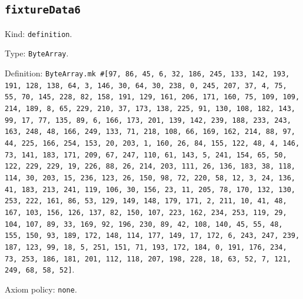 \documentclass[11pt]{article}
\begin{document}
\subsection*{\texttt{fixtureData6}}
\noindent Kind: \texttt{definition}.\par
\noindent Type: \texttt{ByteArray}.\par
\noindent Definition: \texttt{ByteArray.mk \#[97, 86, 45, 6, 32, 186, 245, 133, 142, 193, 191, 128, 138, 64, 3, 146, 30, 64, 30, 238, 0, 245, 207, 37, 4, 75, 55, 70, 145, 228, 82, 158, 191, 129, 161, 206, 171, 160, 75, 109, 109, 214, 189, 8, 65, 229, 210, 37, 173, 138, 225, 91, 130, 108, 182, 143, 99, 17, 77, 135, 89, 6, 166, 173, 201, 139, 142, 239, 188, 233, 243, 163, 248, 48, 166, 249, 133, 71, 218, 108, 66, 169, 162, 214, 88, 97, 44, 225, 166, 254, 153, 20, 203, 1, 160, 26, 84, 155, 122, 48, 4, 146, 73, 141, 183, 171, 209, 67, 247, 110, 61, 143, 5, 241, 154, 65, 50, 122, 229, 229, 19, 226, 88, 26, 214, 203, 111, 26, 136, 183, 38, 118, 114, 30, 203, 15, 236, 123, 26, 150, 98, 72, 220, 58, 12, 3, 24, 136, 41, 183, 213, 241, 119, 106, 30, 156, 23, 11, 205, 78, 170, 132, 130, 253, 222, 161, 86, 53, 129, 149, 148, 179, 171, 2, 211, 10, 41, 48, 167, 103, 156, 126, 137, 82, 150, 107, 223, 162, 234, 253, 119, 29, 104, 107, 89, 33, 169, 92, 196, 230, 89, 42, 108, 140, 45, 55, 48, 155, 150, 93, 189, 172, 148, 114, 177, 149, 17, 172, 6, 243, 247, 239, 187, 123, 99, 18, 5, 251, 151, 71, 193, 172, 184, 0, 191, 176, 234, 73, 253, 186, 181, 201, 112, 118, 207, 198, 228, 18, 63, 52, 7, 121, 249, 68, 58, 52]}.\par
\noindent Axiom policy: \texttt{none}.\par
\end{document}
